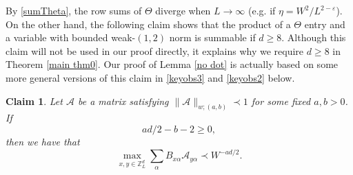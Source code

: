 \documentclass{article}
\newcommand{\1}{\mathds{1}}
\numberwithin{equation}{section}
\newcommand{\al}{\alpha}
\newcommand{\be}{\begin{equation}}
\newcommand{\ee}{\end{equation}}
\newcommand{\e}{{\varepsilon}}
\renewcommand{\cal}{\mathcal}
\newcommand{\wt}{\widetilde}
\renewcommand{\geq}{\geqslant}
\renewcommand{\ge}{\geq}
\newcommand{\Z}{\mathbb{Z}}
\theoremstyle{plain} %
\newtheorem{claim}[theorem]{Claim}
\theoremstyle{remark}
\newcommand{\cor}{\color{red}}
\begin{document}
By \eqref{sumTheta}, the row sums of $\Theta$ diverge when $L\to \infty$ (e.g. if $\eta=W^{2}/L^{2-\e}$). On the other hand, the following claim shows that the product of a $\Theta$ entry and a variable with bounded weak-$(1,2)$ norm is summable if $d\ge 8$. Although this claim will not be used in our proof directly, it explains why we require $d\ge 8$ in Theorem \ref{main thm0}. Our proof of Lemma \ref{no dot} is actually based on some more general versions of this claim in \eqref{keyobs3} and \eqref{keyobs2} below.

 
 \begin{claim}\label{cor: ini bound} 
Let $\cal A$ be a matrix satisfying $\|\cal A\|_{w;(a,b)}\prec 1$ %
for some fixed $a,b>0$. If 
 \be\label{a+b}
 a d/2 - b - 2\ge 0,
 \ee
then we have that
\be\label{BG14}
\max_{x,y\in \Z_L^d} \sum_{ \al }B_{x\al}\cal A_{y\al} \prec  W^{-a d/2}.
 \ee
  \end{claim}
  
\end{document}
